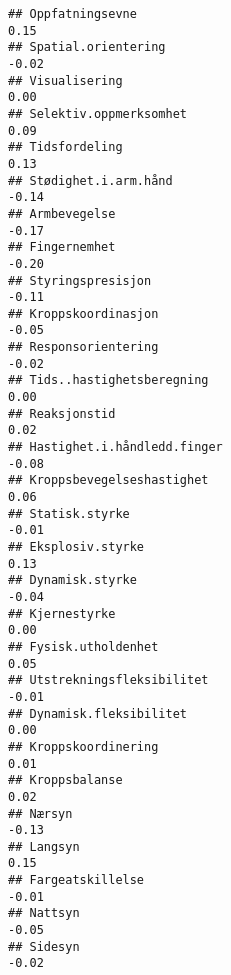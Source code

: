 \documentclass[
]{article}
\begin{document}
\begin{verbatim}
## Oppfatningsevne                                                                   0.15
## Spatial.orientering                                                              -0.02
## Visualisering                                                                     0.00
## Selektiv.oppmerksomhet                                                            0.09
## Tidsfordeling                                                                     0.13
## Stødighet.i.arm.hånd                                                             -0.14
## Armbevegelse                                                                     -0.17
## Fingernemhet                                                                     -0.20
## Styringspresisjon                                                                -0.11
## Kroppskoordinasjon                                                               -0.05
## Responsorientering                                                               -0.02
## Tids..hastighetsberegning                                                         0.00
## Reaksjonstid                                                                      0.02
## Hastighet.i.håndledd.finger                                                      -0.08
## Kroppsbevegelseshastighet                                                         0.06
## Statisk.styrke                                                                   -0.01
## Eksplosiv.styrke                                                                  0.13
## Dynamisk.styrke                                                                  -0.04
## Kjernestyrke                                                                      0.00
## Fysisk.utholdenhet                                                                0.05
## Utstrekningsfleksibilitet                                                        -0.01
## Dynamisk.fleksibilitet                                                            0.00
## Kroppskoordinering                                                                0.01
## Kroppsbalanse                                                                     0.02
## Nærsyn                                                                           -0.13
## Langsyn                                                                           0.15
## Fargeatskillelse                                                                 -0.01
## Nattsyn                                                                          -0.05
## Sidesyn                                                                          -0.02

\end{verbatim}
\end{document}
